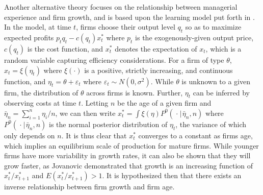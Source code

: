 \documentclass[english]{article}
\begin{document}
Another alternative theory focuses on the relationship between managerial 
experience and firm growth, and is based upon the learning model put forth in \citet{jovanovic1982}.
In the model, at time $t$, firms choose their output level $q_t$ so as to 
maximize expected profits $p_t q_t - c(q_t)x_t^*$ where $p_t$ is the 
exogenously-given output price, $c(q_t)$ is the cost function, and $x_t^*$ 
denotes the expectation of $x_t$, which is a random variable capturing 
efficiency considerations. 
For a firm of type $\theta$, $x_t = \xi (\eta_t)$ where $\xi (\cdot)$ is a 
positive, strictly increasing, and continuous function, and 
$\eta_t = \theta + \varepsilon_t$ where $\varepsilon_t \sim N(0,\sigma^2)$. 
While $\theta$ is unknown to a given firm, the distribution of $\theta$ across 
firms is known. 
Further, $\eta_t$ can be inferred by observing costs at time $t$. 
Letting $n$ be the age of a given firm and 
$\bar{\eta}_n = \sum_{i=1}^n \eta_i/n$, we can then write 
$x_t^* = \int \xi(\eta)P^0(\hspace{1pt} \cdot \hspace{1pt} | 
\hspace{1pt} \bar{\eta}_n, n)$ where $P^0(\hspace{1pt} \cdot 
\hspace{1pt} | \hspace{1pt} \bar{\eta}_n, n)$ is the normal posterior 
distribution of $\eta_t$, the variance of which only depends on $n$. 
It is thus clear that $x_t^*$ converges to a constant as firms age, which implies 
an equilibrium scale of production for mature firms. 
While younger firms have more variability in growth rates, it can also be 
shown that they will grow faster, as Jovanovic demonstrated that growth is an 
increasing function of $x_t^*/x_{t+1}^*$ and $E(x_t^*/x_{t+1}^*)>1$. 
It is hypothesized then that there exists an inverse relationship between 
firm growth and firm age.
\end{document}
